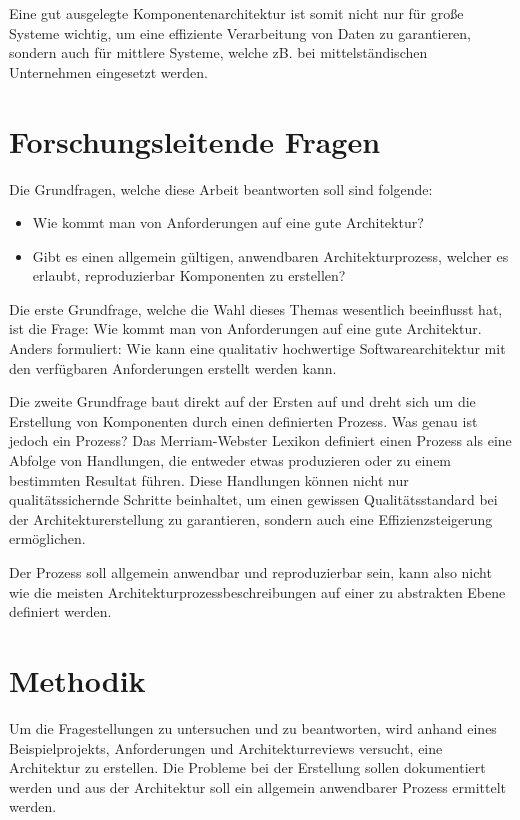 Eine gut ausgelegte Komponentenarchitektur ist somit nicht nur für große Systeme wichtig, um eine effiziente Verarbeitung von Daten zu garantieren, sondern auch für mittlere Systeme, welche zB. bei mittelständischen Unternehmen eingesetzt werden.

\section{Forschungsleitende Fragen}
Die Grundfragen, welche diese Arbeit beantworten soll sind folgende:

\begin{itemize}
  \item Wie kommt man von Anforderungen auf eine gute Architektur?
  \item Gibt es einen allgemein gültigen, anwendbaren Architekturprozess, welcher es erlaubt, reproduzierbar Komponenten zu erstellen?
\end{itemize}

Die erste Grundfrage, welche die Wahl dieses Themas wesentlich beeinflusst hat, ist die Frage: Wie kommt man von Anforderungen auf eine gute Architektur. Anders formuliert: Wie kann eine qualitativ hochwertige Softwarearchitektur mit den verfügbaren Anforderungen erstellt werden kann.

Die zweite Grundfrage baut direkt auf der Ersten auf und dreht sich um die Erstellung von Komponenten durch einen definierten Prozess. Was genau ist jedoch ein Prozess? Das Merriam-Webster Lexikon definiert einen Prozess als eine Abfolge von Handlungen, die entweder etwas produzieren oder zu einem bestimmten Resultat führen\cite{processweb}. Diese Handlungen können nicht nur qualitätssichernde Schritte beinhaltet, um einen gewissen Qualitätsstandard bei der Architekturerstellung zu garantieren, sondern auch eine Effizienzsteigerung ermöglichen.

Der Prozess soll allgemein anwendbar und reproduzierbar sein, kann also nicht wie die meisten Architekturprozessbeschreibungen auf einer zu abstrakten Ebene definiert werden.

\section{Methodik}
Um die Fragestellungen zu untersuchen und  zu beantworten, wird anhand eines  Beispielprojekts, Anforderungen und Architekturreviews versucht, eine Architektur zu erstellen. Die Probleme bei der Erstellung sollen dokumentiert werden und aus der Architektur soll ein allgemein anwendbarer Prozess ermittelt werden.


